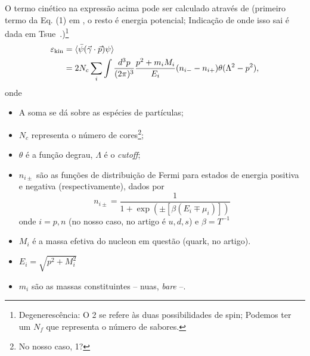O termo cinético na expressão acima pode ser calculado através de (primeiro termo da Eq. (1) em \cite{PRC_68_035804_2003}, o resto é energia potencial; Indicação de onde isso sai é dada em Tsue~\cite{japoneses}.)\footnote{Degenerescência: O 2 se refere às duas possibilidades de spin; Podemos ter um $N_f$ que representa o número de sabores.}
\begin{align}
	\varepsilon_{\rm{kin}} &= \langle\bar{\psi}(\vec{\gamma}\cdot\vec{p})\psi\rangle \\
	&= 2 N_c\sum_i \int \frac{d^3p}{(2\pi)^3}\frac{p^2 + m_i M_i}{E_i}(n_{i-}-n_{i+})\theta(\Lambda^2 - p^2),
\end{align}
%
onde
\begin{itemize}
	\item A soma se dá sobre as espécies de partículas;
	\item $N_c$ representa o número de cores\footnote{No nosso caso, 1?};
	\item $\theta$ é a função degrau, $\Lambda$ é o \emph{cutoff};
	\item $n_{i\pm}$ são as funções de distribuição de Fermi para estados de energia positiva e negativa (respectivamente), dados por
	\begin{equation}
		n_{i\pm} = \frac{1}{1 + \exp(\pm[\beta(E_i\mp\mu_i)])}
	\end{equation}
	onde $i = p, n$ (no nosso caso, no artigo é $u, d, s$) e $\beta = T^{-1}$
	\item $M_i$ é a massa efetiva do nucleon em questão (quark, no artigo).
	\item $E_i = \sqrt{p^2 + M_i^2}$
	\item $m_i$ são as massas constituintes -- nuas, \emph{bare} --.
\end{itemize}

